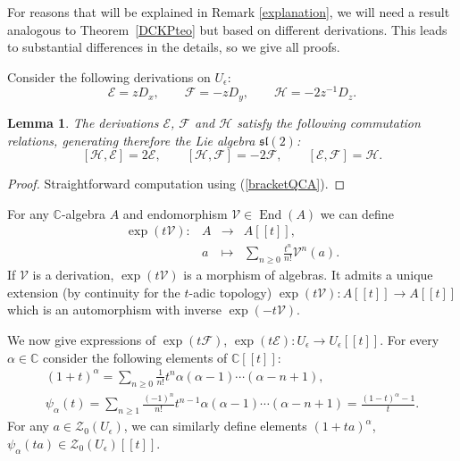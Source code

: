 \documentclass[pdftex]{sigma}%
\numberwithin{equation}{section}
\numberwithin{figure}{section}
\newtheorem{lem}[teo]{Lemma}
\newcommand{\fonc}[5]{ %
 \begin{array}{lcll}#1 :& #2 & \longrightarrow & #3 \\ %
 &#4 &\longmapsto & #5 %
 \end{array}}
\newcommand{\e}{\epsilon}
\newcommand{\ra}{\rightarrow}
\begin{document}
For reasons that will be explained in Remark \ref{explanation}, we will need a result analogous to Theorem~\ref{DCKPteo} but based on different derivations. This leads to substantial differences in the details, so we give all proofs.

Consider the following derivations on $U_{\epsilon}$:
\begin{equation}
\mathcal {E}=zD_x,\qquad
\mathcal{F}=-zD_y,\qquad
\mathcal{H}=-2z^{-1}D_z.
\end{equation}

\begin{lem} \label{Liecommutationslem}
The derivations $\mathcal {E}$, $\mathcal {F}$ and $\mathcal {H}$ satisfy the following commutation relations, gene\-ra\-ting therefore the Lie algebra ${\mathfrak{sl}}(2)$:
\begin{equation}\label{Liecommutations}
[\mathcal{H},\mathcal{E}]=2\mathcal{E},\qquad
[\mathcal{H},\mathcal{F}]=-2\mathcal{F}, \qquad
[\mathcal{E},\mathcal{F}]=\mathcal{H}.
\end{equation}
\end{lem}

\begin{proof}
Straightforward computation using (\ref{bracketQCA}).
\end{proof}

For any ${\mathbb C}$-algebra $A$ and endomorphism ${\mathcal V}\in {\operatorname{End}}(A)$ we can define
\[
\fonc{\exp(t{\mathcal V})}{A}{A[[t]],}{a}{\sum_{n\geq 0}\frac{t^n}{n!}{\mathcal V}^n(a).}
\]
If ${\mathcal V}$ is a derivation, $\exp(t{\mathcal V})$ is a morphism of algebras. It admits a unique extension (by continuity for the $t$-adic topology)
$\exp(t{\mathcal V})\colon A[[t]]\rightarrow A[[t]]$ which is an automorphism with inverse $\exp(-t{\mathcal V}).$

We now give expressions of $\exp(t{\mathcal F})$, $\exp(t{\mathcal E})\colon U_\e\ra U_\e[[t]]$. For every $\alpha\in {\mathbb C}$ consider the following elements of ${\mathbb C}[[t]]$:
\begin{gather*}
(1+t)^{\alpha} =\sum_{n\geq 0}\frac{1}{n!}t^n \alpha(\alpha-1)\cdots (\alpha-n+1),
\\
\psi_{\alpha}(t) =\sum_{n\geq 1}\frac{(-1)^n}{n!}t^{n-1} \alpha(\alpha-1)\cdots (\alpha-n+1)= \frac{(1-t)^{\alpha}-1 }{t} .
\end{gather*}
For any $a\in \mathcal{Z}_0(U_\e)$, we can similarly define elements $(1+ta)^{\alpha}$, $\psi_{\alpha}(ta)\in \mathcal{Z}_0(U_\e)[[t]]$.
\end{document}
